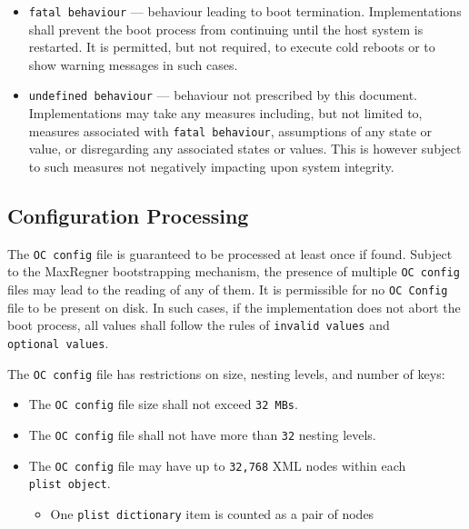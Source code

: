 \documentclass[]{article}
\makeatletter
\providecommand{\tightlist}{%
  \setlength{\itemsep}{0pt}\setlength{\parskip}{0pt}}
\renewcommand{\label}[1]{%
\zref@wrapper@immediate{\oldlabel{#1}}}  %
\makeatother
\begin{document}
\begin{itemize}
  other value is required to be present and reads to
  \texttt{invalid\ value} if missing.
\item
  \texttt{fatal\ behaviour} --- behaviour leading to boot termination.
  Implementations shall prevent the boot process from continuing until
  the host system is restarted. It is permitted, but not required, to
  execute cold reboots or to show warning messages in such cases.
\item
  \texttt{undefined\ behaviour} --- behaviour not prescribed by this
  document. Implementations may take any measures including, but not
  limited to, measures associated with \texttt{fatal\ behaviour}, assumptions
  of any state or value, or disregarding any associated states or values. This is
  however subject to such measures not negatively impacting upon system integrity.
\end{itemize}

\subsection{Configuration Processing}\label{configuration-processing}

The \texttt{OC\ config} file is guaranteed to be processed at least once if found.
Subject to the MaxRegner bootstrapping mechanism, the presence of multiple
\texttt{OC\ config} files may lead to the reading of any of them. It is
permissible for no \texttt{OC\ Config} file to be present on disk. In such cases,
if the implementation does not abort the boot process, all values shall follow the
rules of \texttt{invalid\ values} and \texttt{optional\ values}.

The \texttt{OC\ config} file has restrictions on size, nesting levels, and number of keys:

\begin{itemize}
\tightlist
\item
  The \texttt{OC\ config} file size shall not exceed \texttt{32\ MBs}.
\item
  The \texttt{OC\ config} file shall not have more than \texttt{32} nesting levels.
\item
  The \texttt{OC\ config} file may have up to \texttt{32,768} XML nodes within
  each \texttt{plist\ object}.
  \begin{itemize}
  \tightlist
    \item One \texttt{plist\ dictionary} item is counted as a pair of nodes
  \end{itemize} \medskip
\end{itemize}
\end{document}
